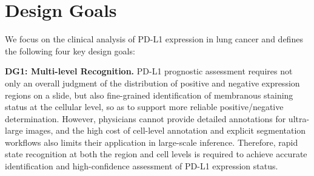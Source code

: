 \documentclass[journal]{vgtc}                     %
\begin{document}

\section{Design Goals}
We focus on the clinical analysis of PD-L1 expression in lung cancer and defines the following four key design goals:

\textbf{DG1: Multi-level Recognition.}
PD-L1 prognostic assessment requires not only an overall judgment of the distribution of positive and negative expression regions on a slide, but also fine-grained identification of membranous staining status at the cellular level, so as to support more reliable positive/negative determination. However, physicians cannot provide detailed annotations for ultra-large images, and the high cost of cell-level annotation and explicit segmentation workflows also limits their application in large-scale inference. Therefore, rapid state recognition at both the region and cell levels is required to achieve accurate identification and high-confidence assessment of PD-L1 expression status.
\end{document}
